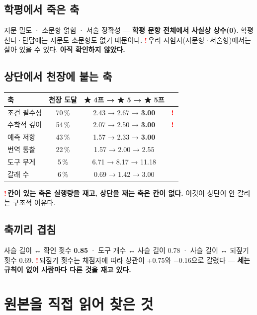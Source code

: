\documentclass[11pt]{article}
\newcommand{\R}{\textcolor{red}{\textbf{!}}\,}
\begin{document}
\subsection{학평에서 죽은 축}

지문 밀도 · 소문항 얽힘 · 서술 정확성 — \textbf{학평 문항 전체에서 사실상 상수(0)}.
학평 선다·단답에는 지문도 소문항도 없기 때문이다.
\R 우리 시험지(지문형·서술형)에서는 살아 있을 수 있다. \textbf{아직 확인하지 않았다.}

\subsection{상단에서 천장에 붙는 축}

\begin{center}
\begin{tabular}{@{}lccc@{}}
\toprule
\textbf{축} & \textbf{천장 도달} & \textbf{★ 4프 → ★ 5 → ★ 5프} & \\
\midrule
조건 필수성 & 70\,\% & 2.43 → 2.67 → \textbf{3.00} & \R \\
수학적 깊이 & 54\,\% & 2.07 → 2.50 → \textbf{3.00} & \R \\
예측 저항 & 43\,\% & 1.57 → 2.33 → \textbf{3.00} & \\
번역 통찰 & 22\,\% & 1.57 → 2.00 → 2.55 & \\
\midrule
도구 무게 & 5\,\% & 6.71 → 8.17 → 11.18 & \\
갈래 수 & 6\,\% & 0.69 → 1.42 → 3.00 & \\
\bottomrule
\end{tabular}
\end{center}

\vspace{2mm}
\R \textbf{칸이 있는 축은 실행량을 재고, 상단을 재는 축은 칸이 없다.}
이것이 상단이 안 갈리는 구조적 이유다.

\subsection{축끼리 겹침}

사슬 길이 ↔ 확인 횟수 \textbf{0.85} · 도구 개수 ↔ 사슬 길이 0.78 · 사슬 길이 ↔ 되짚기 횟수 0.69.
\R 되짚기 횟수는 채점자에 따라 상관이 +0.75와 −0.16으로 갈렸다 —
\textbf{세는 규칙이 없어 사람마다 다른 것을 재고 있다.}

\section{원본을 직접 읽어 찾은 것}
\end{document}
